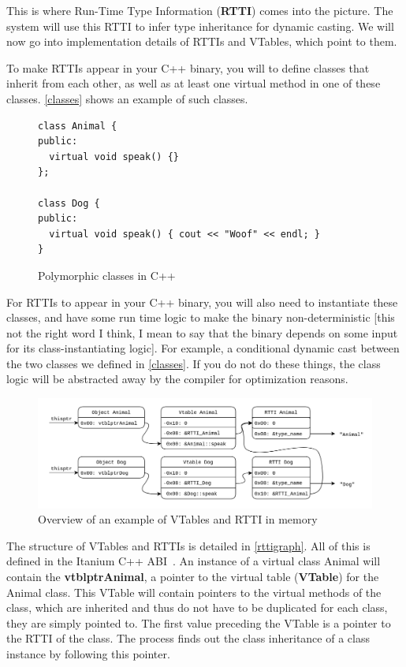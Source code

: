 \documentclass[a4paper,11pt,oneside]{report}
\begin{document}
This is where Run-Time Type Information (\textbf{RTTI}) comes into the picture.
The system will use this RTTI to infer type inheritance for dynamic casting.
We will now go into implementation details of RTTIs and VTables, which point to them.

To make RTTIs appear in your C++ binary, you will to define classes that inherit from each other, as well as at least one virtual method in one of these classes.
\autoref{classes} shows an example of such classes.

\begin{figure}[h]
\begin{lstlisting}
class Animal {
public:
  virtual void speak() {}
};

class Dog {
public:
  virtual void speak() { cout << "Woof" << endl; }
}
\end{lstlisting}
\caption{Polymorphic classes in C++}
\label{classes}

\end{figure}

For RTTIs to appear in your C++ binary, you will also need to instantiate these classes, and have some run time logic to make the binary non-deterministic [this not the right word I think, I mean to say that the binary depends on some input for its class-instantiating logic].
For example, a conditional dynamic cast between the two classes we defined in \autoref{classes}.
If you do not do these things, the class logic will be abstracted away by the compiler for optimization reasons.

\begin{figure}[h]

\includegraphics[width=16cm]{RTTI_graph.png}
\caption{Overview of an example of VTables and RTTI in memory}
\label{rttigraph}

\end{figure}

The structure of VTables and RTTIs is detailed in \autoref{rttigraph}.
All of this is defined in the Itanium C++ ABI~\cite{cppabi}.
An instance of a virtual class Animal will contain the \textbf{vtblptrAnimal}, a pointer to the virtual table (\textbf{VTable}) for the Animal class.
This VTable will contain pointers to the virtual methods of the class, which are inherited and thus do not have to be duplicated for each class, they are simply pointed to.
The first value preceding the VTable is a pointer to the RTTI of the class. The process finds out the class inheritance of a class instance by following this pointer.
\end{document}
